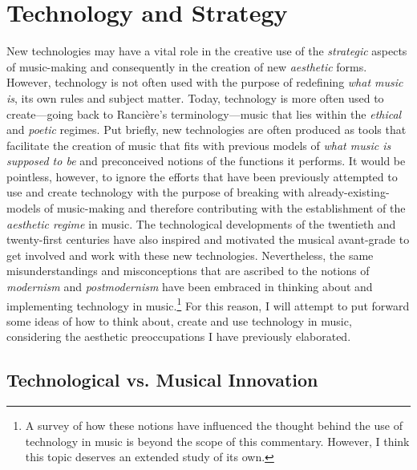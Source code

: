\hypertarget{chapter4}{}
\chapter{Technology and Strategy}

New technologies may have a vital role in the creative use of the \emph{strategic} aspects of music-making and consequently in the creation of new \emph{aesthetic} forms. However, technology is not often used with the purpose of redefining \emph{what music is}, its own rules and subject matter. Today, technology is more often used to create---going back to Ranci\`{e}re's terminology---music that lies within the \emph{ethical} and \emph{poetic} regimes. Put briefly, new technologies are often produced as tools that facilitate the creation of music that fits with previous models of \emph{what music is supposed to be} and preconceived notions of the functions it performs. It would be pointless, however, to ignore the efforts that have been previously attempted to use and create technology with the purpose of breaking with already-existing-models of music-making and therefore contributing with the establishment of the \emph{aesthetic regime} in music. The technological developments of the twentieth and twenty-first centuries have also inspired and motivated the musical avant-grade to get involved and work with these new technologies. Nevertheless, the same misunderstandings and misconceptions that are ascribed to the notions of \emph{modernism} and \emph{postmodernism} have been embraced in thinking about and implementing technology in music.\footnote{A survey of how these notions have influenced the thought behind the use of technology in music is beyond the scope of this commentary. However, I think this topic deserves an extended study of its own.}  For this reason, I will attempt to put forward some ideas of how to think about, create and use technology in music, considering the aesthetic preoccupations I have previously elaborated.

\section{Technological vs. Musical Innovation}

